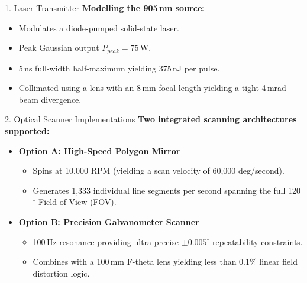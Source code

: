 \documentclass[10pt,aspectratio=169]{beamer}
\begin{document}
\begin{frame}{1. Laser Transmitter}
    \textbf{Modelling the 905\,nm source:}
    \begin{itemize}
         \item Modulates a diode-pumped solid-state laser.
         \item Peak Gaussian output $P_{peak} = 75$\,W.
         \item 5\,ns full-width half-maximum yielding 375\,nJ per pulse.
         \item Collimated using a lens with an 8\,mm focal length yielding a tight 4\,mrad beam divergence.
    \end{itemize}
\end{frame}

\begin{frame}{2. Optical Scanner Implementations}
    \textbf{Two integrated scanning architectures supported:}
    \vspace{4mm}
    \begin{itemize}
        \item \textbf{Option A: High-Speed Polygon Mirror}
        \begin{itemize}
            \item Spins at 10,000 RPM (yielding a scan velocity of 60,000 deg/second).
            \item Generates 1,333 individual line segments per second spanning the full 120$^\circ{}$ Field of View (FOV).
        \end{itemize}
        \item \textbf{Option B: Precision Galvanometer Scanner}
        \begin{itemize}
            \item 100\,Hz resonance providing ultra-precise $\pm0.005^{\circ}$ repeatability constraints.
            \item Combines with a 100\,mm F-theta lens yielding less than 0.1\% linear field distortion logic.
        \end{itemize}
    \end{itemize}
\end{frame}
\end{document}
